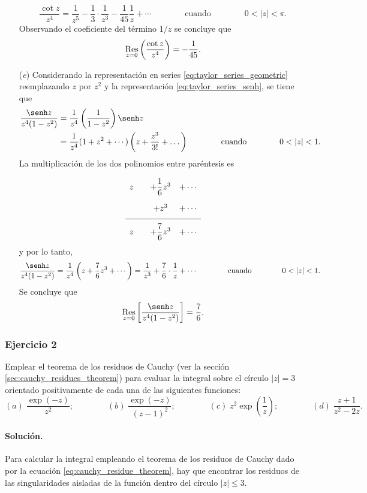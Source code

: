 \documentclass[a4paper]{report}
\def\Res{\qopname\relax m{Res}}
\begin{document}
\begin{enumerate}
 \[
  \frac{\cot z}{z^4}=\frac{1}{z^5}-\frac{1}{3}\cdot\frac{1}{z^3}-\frac{1}{45}\frac{1}{z}+\cdots 
  \qquad\qquad\textrm{cuando}\qquad\qquad
   0<|z|<\pi.
 \]
 Observando el coeficiente del término \(1/z\) se concluye que
 \[
  \Res_{z=0}\left(\frac{\cot z}{z^4}\right)=-\frac{1}{45}.
 \]
 \item[(\textit{e})] Considerando la representación en series \ref{eq:taylor_series_geometric} reemplazando \(z\) por \(z^2\) y la representación \ref{eq:taylor_series_senh}, se tiene que 
 \begin{align*}
  \frac{\senh z}{z^4(1-z^2)}&=\frac{1}{z^4}\left(\frac{1}{1-z^2}\right)\senh z\\
   &=\frac{1}{z^4}(1+z^2+\cdots)\left(z+\frac{z^3}{3!}+\dots\right)
  \qquad\qquad\textrm{cuando}\qquad\qquad
   0<|z|<1.  
 \end{align*}
La multiplicación de los dos polinomios entre paréntesis es
\[
\setlength\extrarowheight{10pt}
\begin{array}[t]{cccc}
 z &       & +\dfrac{1}{6}z^3 &+\cdots\\
   &       & +z^3             &+\cdots\\[\medskipamount]   
\cline{1-4}
 z &       & +\dfrac{7}{6}z^3 &+\cdots
\end{array}
\]
y por lo tanto,
\[
 \frac{\senh z}{z^4(1-z^2)}=\frac{1}{z^4}\left(z+\frac{7}{6}z^3+\cdots\right)
 =\frac{1}{z^3}+\frac{7}{6}\cdot\frac{1}{z}+\cdots
 \qquad\qquad\textrm{cuando}\qquad\qquad
 0<|z|<1. 
\]
Se concluye que 
\[
 \Res_{z=0}\left[\frac{\senh z}{z^4(1-z^2)}\right]=\frac{7}{6}.
\]
\end{enumerate} 

\subsubsection*{Ejercicio 2}

Emplear el teorema de los residuos de Cauchy (ver la sección \ref{sec:cauchy_residues_theorem}) para evaluar la integral sobre el círculo \(|z|=3\) orientado positivamente de cada una de las siguientes funciones: 
\[
 (\textit{a})\;\frac{\exp(-z)}{z^2};\qquad\qquad (\textit{b})\;\frac{\exp(-z)}{(z-1)^2};\qquad\qquad
 (\textit{c})\;z^2\exp\left(\frac{1}{z}\right);\qquad\qquad (\textit{d})\;\frac{z+1}{z^2-2z}.
\]

\paragraph{Solución.} Para calcular la integral empleando el teorema de los residuos de Cauchy dado por la ecuación \ref{eq:cauchy_residue_theorem}, hay que encontrar los residuos de las singularidades aisladas de la función dentro del círculo \(|z|\leq3\).
\end{document}
